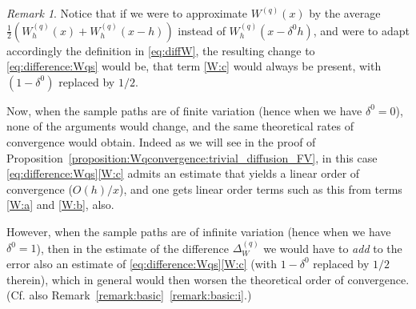 \documentclass[pdftex,oneside,11pt,reqno]{amsart}
\theoremstyle{definition}
\theoremstyle{theorem}
\theoremstyle{remark}
\newtheorem{remark}{Remark}[section]
\numberwithin{equation}{section}
\numberwithin{definition}{section}
\begin{document}
\begin{remark}\label{remark:approx_by_mean}
Notice that if we were to approximate $W^{(q)}(x)$ by the average $\frac{1}{2}(W^{(q)}_h(x)+W^{(q)}_h(x-h))$ instead of $W^{(q)}_h(x-\delta^0h)$, and were to adapt accordingly the definition in \eqref{eq:diffW}, the resulting change to  \eqref{eq:difference:Wqs} would be, that  term \ref{W:c}
 would always be present, with $(1-\delta^0)$ replaced by $1/2$. 

Now, when the sample paths are of finite variation (hence when we have $\delta^0=0$), none of the arguments would change, and the same theoretical rates of convergence would obtain.  Indeed as we will see in the proof of Proposition~\ref{proposition:Wqconvergence:trivial_diffusion_FV}, in this case \eqref{eq:difference:Wqs}\ref{W:c} admits an estimate that yields a linear order of convergence ($O(h)/x$), and one gets linear order terms such as this from terms \ref{W:a} and  \ref{W:b}, also. 

However, when the sample paths are of infinite variation (hence when we have $\delta^0=1$), then in the estimate of the difference $\Delta_W^{(q)}$ we would have to \emph{add} to the error also an estimate of \eqref{eq:difference:Wqs}\ref{W:c} (with $1-\delta^0$ replaced by $1/2$ therein), which in general would then worsen the theoretical order of convergence. (Cf. also Remark~\ref{remark:basic}~\ref{remark:basic:i}.)
\end{remark}
\end{document}
